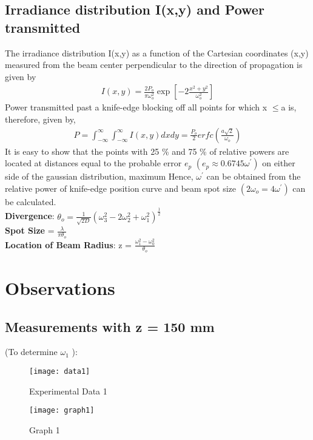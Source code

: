 \documentclass[
	letterpaper, %
	10pt, %
]{CSUniSchoolLabReport}
\begin{document}
\subsection{Irradiance distribution I(x,y) and Power transmitted}
The irradiance distribution I(x,y) as a function of the Cartesian coordinates (x,y)
measured from the beam center perpendicular to the direction of propagation is given by
\begin{gather}
	I(x,y) = \frac{2P_{o}}{\pi \omega_{o} ^{2}}\exp [{-2\frac{x^{2}+y^2 }{\omega_o ^2}}]
\end{gather}
Power transmitted past a knife-edge blocking off all points for which x \(\leq\)a is, therefore, given by,
\begin{gather}
	P = \int_{-\infty }^{\infty } \int_{-\infty }^{\infty }  I(x,y) dx dy = \frac{P_{o} }{2} erfc(\frac{a \sqrt{2} }{\omega_{o} })
\end{gather}
It is easy to show that the points with 25 \% and 75 \% of relative powers are located at distances equal to the probable error \(e_p\) \((e_p \approx 0.6745 \omega^\prime )\) on either side of the gaussian distribution, maximum Hence, \(\omega^\prime \)  can be obtained from the relative  power of knife-edge position curve and beam spot size \((2 \omega_{o} = 4 \omega^\prime )\)  can be calculated. \\
\textbf{Divergence}: \(\theta_o  = \frac{1}{\sqrt{2D} }(\omega_3 ^2 - 2 \omega_2 ^2 + \omega_1 ^2 )^\frac{1}{2}\) \\
\textbf{Spot Size} = \(\frac{\lambda}{\pi \theta_o}\) \\
\textbf{Location of Beam Radius}: z = \(\frac{\omega_1 ^2 - \omega_0 ^2 }{\theta_o}\) 
\section{Observations}
\subsection{Measurements with z = 150 mm}
(To determine \(\omega_1\) ):
\begin{figure}[H] %
	\centering %
	\texttt{[image: data1]} %
	\caption{Experimental Data 1}
\end{figure}
\begin{figure}[H] %
	\centering %
	\texttt{[image: graph1]} %
	\caption{Graph 1}
\end{figure}
\newpage
\end{document}
